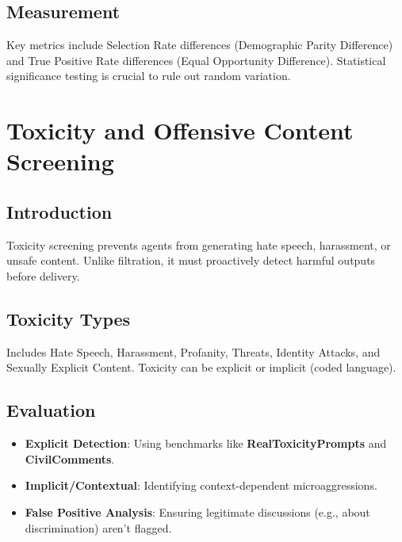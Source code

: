 \begin{TNtwocol}
\subsection{Measurement}
Key metrics include Selection Rate differences (Demographic Parity Difference) and True Positive Rate differences (Equal Opportunity Difference). Statistical significance testing is crucial to rule out random variation.
\section{Toxicity and Offensive Content Screening }
\subsection{Introduction}
Toxicity screening prevents agents from generating hate speech, harassment, or unsafe content. Unlike filtration, it must proactively detect harmful outputs before delivery.

\subsection{Toxicity Types}
Includes Hate Speech, Harassment, Profanity, Threats, Identity Attacks, and Sexually Explicit Content. Toxicity can be explicit or implicit (coded language).

\subsection{Evaluation}
\begin{itemize}
    \item \textbf{Explicit Detection}: Using benchmarks like \textbf{RealToxicityPrompts} and \textbf{CivilComments}.
    \item \textbf{Implicit/Contextual}: Identifying context-dependent microaggressions.
    \item \textbf{False Positive Analysis}: Ensuring legitimate discussions (e.g., about discrimination) aren't flagged.
\end{itemize}
\end{TNtwocol}
